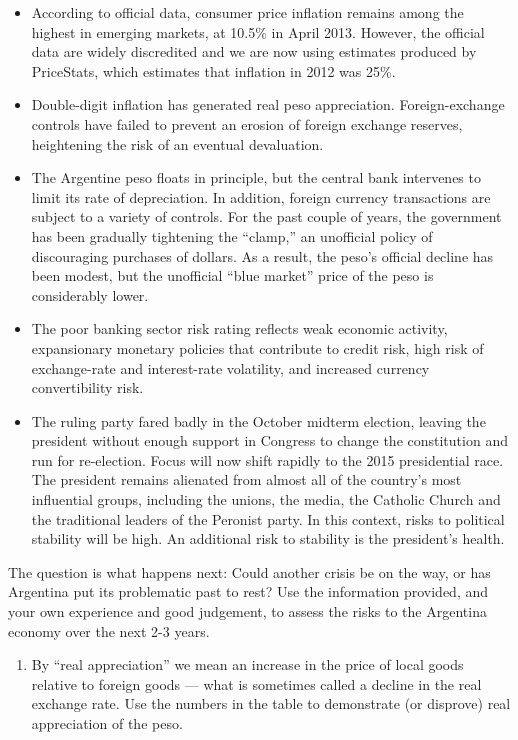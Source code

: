 \begin{enumerate}
\begin{itemize}
\item According to official data, consumer price inflation remains among the highest
in emerging markets, at 10.5\% in April 2013. However, the official data are
widely discredited and we are now using estimates produced by PriceStats,
which estimates that inflation in 2012 was 25\%.

\item Double-digit inflation has generated real peso appreciation.
Foreign-exchange controls have failed to prevent an erosion of 
foreign exchange reserves, 
heightening the risk of an eventual devaluation.

\item The Argentine peso floats in principle, but the central bank intervenes to limit
its rate of depreciation.
In addition, foreign currency transactions are subject to a variety of controls.
For the past couple of years, the government has 
been gradually tightening the ``clamp,''
an unofficial policy of discouraging purchases of dollars.
As a result, the peso's official decline has been modest,
but the unofficial ``blue market'' price of the peso is considerably lower.

\item The poor banking sector risk rating reflects weak economic activity, expansionary
monetary policies that contribute to credit risk, high risk of exchange-rate
and interest-rate volatility, and increased currency convertibility risk.

\item The ruling party fared badly in the October midterm election,
 leaving the president without enough support in Congress
 to change the constitution and run for re-election.
 Focus will now shift rapidly to the 2015 presidential race.
 The president remains alienated from almost all of the country's most influential groups,
including the unions, the media, the Catholic Church and the traditional
leaders of the Peronist party. In this context, risks to political stability will be
high. An additional risk to stability is the president's health.
\end{itemize}
%
The question is what happens next:  Could another crisis be on the way,
or has Argentina put its problematic past to rest?
Use the information provided, and your own experience and good judgement,
to assess the risks to the Argentina economy over the next 2-3 years.
%
\begin{enumerate}
\item By ``real appreciation'' we mean an increase in the price
of local goods relative to foreign goods ---
what is sometimes called a decline in the real exchange rate.
Use the numbers in the table to demonstrate (or disprove) real appreciation
of the peso.


\end{enumerate}
\end{enumerate}
